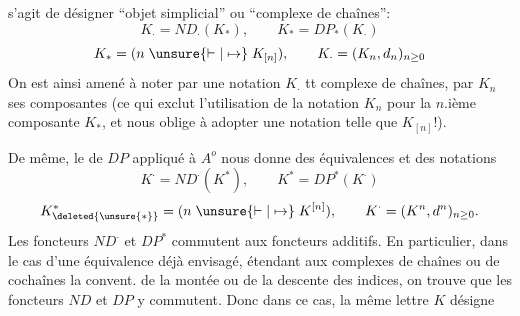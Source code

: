 s'agit de désigner  ``objet simplicial'' ou ``complexe de chaînes'':
\[
 K_{\cdot}=ND_{\cdot}(K_*),\qquad K_*=DP_*(K_{\cdot})
\]
\[
 K_*=(n\mathrel{\unsure{\vdash|\mapsto}}K_{[n]}),\qquad
 K_{\cdot}=(K_n,d_n)_{n\geq0}
\]
On est ainsi amené à noter par une notation $K_{\cdot}$ tt complexe de chaînes,
par $K_n$ ses composantes (ce qui exclut l'utilisation de la notation $K_n$
pour la $n$.ième composante  $K_*$, et nous oblige à adopter
une notation telle que $K_{[n]}$!).

De même, le  de $DP$ appliqué à $A^o$ nous donne des équivalences
et des notations
\[
 K^{\cdot}=ND^{\cdot}(K^*),\qquad K^*=DP^*(K^{\cdot})
\]
\[
 K^{*}_{\deleted{\unsure{*}}}=(n\mathrel{\unsure{\vdash|\mapsto}}K^{[n]}),\qquad
 K^{\cdot}=(K^n,d^n)_{n\geq0}.
\]
Les foncteurs $ND^{\cdot}$ et $DP^*$ commutent aux foncteurs additifs.
En particulier, dans le cas d'une équivalence
déjà envisagé, étendant aux complexes de chaînes ou de cochaînes la convent.
de la montée ou de la descente des indices, on trouve que les foncteurs
$ND$ et $DP$ y commutent. Donc dans ce cas, la même lettre $K$ désigne
